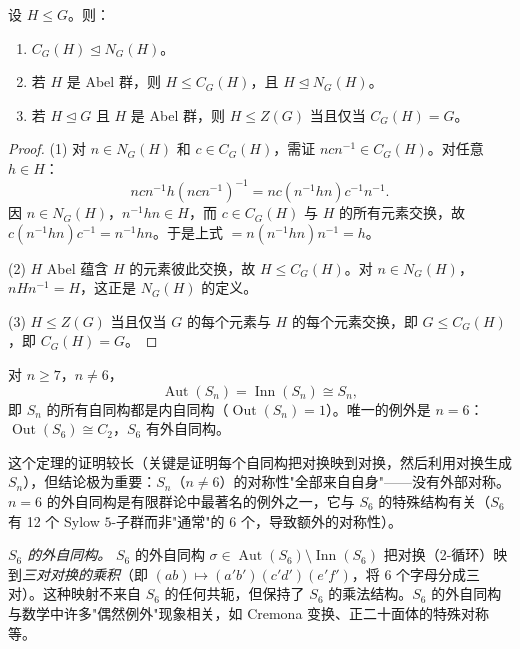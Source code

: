 \begin{proposition}[中心化子的正规化子性质]
\label{prop:centralizer-normalizer}
设 $H\leqslant G$。则：
\begin{enumerate}
\item $C_G(H)\mathrel{\trianglelefteq} N_G(H)$。
\item 若 $H$ 是 Abel 群，则 $H\leqslant C_G(H)$，且 $H\mathrel{\trianglelefteq} N_G(H)$。
\item 若 $H\mathrel{\trianglelefteq} G$ 且 $H$ 是 Abel 群，则 $H\leqslant Z(G)$ 当且仅当 $C_G(H)=G$。
\end{enumerate}
\end{proposition}

\begin{proof}
(1) 对 $n\in N_G(H)$ 和 $c\in C_G(H)$，需证 $ncn^{-1}\in C_G(H)$。对任意 $h\in H$：
\[
ncn^{-1}h(ncn^{-1})^{-1}=nc(n^{-1}hn)c^{-1}n^{-1}.
\]
因 $n\in N_G(H)$，$n^{-1}hn\in H$，而 $c\in C_G(H)$ 与 $H$ 的所有元素交换，故 $c(n^{-1}hn)c^{-1}=n^{-1}hn$。于是上式 $=n(n^{-1}hn)n^{-1}=h$。

(2) $H$ Abel 蕴含 $H$ 的元素彼此交换，故 $H\leqslant C_G(H)$。对 $n\in N_G(H)$，$nHn^{-1}=H$，这正是 $N_G(H)$ 的定义。

(3) $H\leqslant Z(G)$ 当且仅当 $G$ 的每个元素与 $H$ 的每个元素交换，即 $G\leqslant C_G(H)$，即 $C_G(H)=G$。
\end{proof}

\begin{theorem}[对称群的自同构群]
\label{thm:symmetric-aut}
对 $n\geqslant7$，$n\neq6$，
\[
\operatorname{Aut}(S_n)=\operatorname{Inn}(S_n)\cong S_n,
\]
即 $S_n$ 的所有自同构都是内自同构（$\operatorname{Out}(S_n)=1$）。唯一的例外是 $n=6$：$\operatorname{Out}(S_6)\cong C_2$，$S_6$ 有外自同构。
\end{theorem}

这个定理的证明较长（关键是证明每个自同构把对换映到对换，然后利用对换生成 $S_n$），但结论极为重要：$S_n$（$n\neq6$）的对称性"全部来自自身"——没有外部对称。$n=6$ 的外自同构是有限群论中最著名的例外之一，它与 $S_6$ 的特殊结构有关（$S_6$ 有 12 个 Sylow $5$-子群而非"通常"的 6 个，导致额外的对称性）。

\medskip
\noindent\emph{$S_6$ 的外自同构。}
$S_6$ 的外自同构 $\sigma\in\operatorname{Aut}(S_6)\setminus\operatorname{Inn}(S_6)$ 把对换（2-循环）映到\emph{三对对换的乘积}（即 $(ab)\mapsto(a'b')(c'd')(e'f')$，将 6 个字母分成三对）。这种映射不来自 $S_6$ 的任何共轭，但保持了 $S_6$ 的乘法结构。$S_6$ 的外自同构与数学中许多"偶然例外"现象相关，如 Cremona 变换、正二十面体的特殊对称等。
\par\medskip

